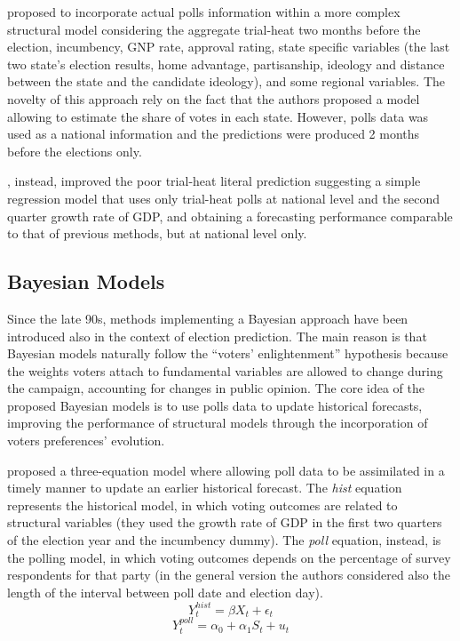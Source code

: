\documentclass[
  12pt]{article}
\begin{document}
\citet{gel:kin:1993} proposed to incorporate actual polls information
within a more complex structural model considering the aggregate
trial-heat two months before the election, incumbency, GNP rate,
approval rating, state specific variables (the last two state's election
results, home advantage, partisanship, ideology and distance between the
state and the candidate ideology), and some regional variables. The
novelty of this approach rely on the fact that the authors proposed a
model allowing to estimate the share of votes in each state. However,
polls data was used as a national information and the predictions were
produced 2 months before the elections only.

\citet{cam:1996}, instead, improved the poor trial-heat literal
prediction suggesting a simple regression model that uses only
trial-heat polls at national level and the second quarter growth rate of
GDP, and obtaining a forecasting performance comparable to that of
previous methods, but at national level only.

\hypertarget{bayesian-models}{%
\subsection{Bayesian Models}\label{bayesian-models}}

Since the late 90s, methods implementing a Bayesian approach have been
introduced also in the context of election prediction. The main reason
is that Bayesian models naturally follow the ``voters' enlightenment''
hypothesis because the weights voters attach to fundamental variables
are allowed to change during the campaign, accounting for changes in
public opinion. The core idea of the proposed Bayesian models is to use
polls data to update historical forecasts, improving the performance of
structural models through the incorporation of voters preferences'
evolution.

\citet{bro:cha:1999} proposed a three-equation model where allowing poll
data to be assimilated in a timely manner to update an earlier
historical forecast. The \emph{hist} equation represents the historical
model, in which voting outcomes are related to structural variables
(they used the growth rate of GDP in the first two quarters of the
election year and the incumbency dummy). The \emph{poll} equation,
instead, is the polling model, in which voting outcomes depends on the
percentage of survey respondents for that party (in the general version
the authors considered also the length of the interval between poll date
and election day). \[Y_{t}^{hist} = \beta X_t + \epsilon_t\]
\[Y_{t}^{poll} = \alpha_0 + \alpha_1 S_t + u_t\]
\end{document}
